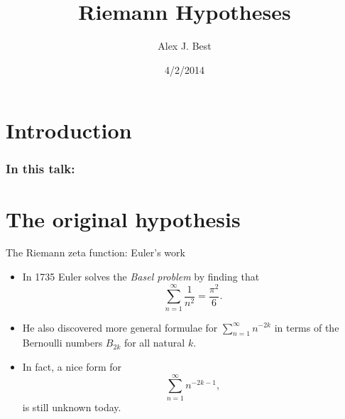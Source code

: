 \documentclass{beamer}
\author{Alex J. Best}
\institute{WMS Talks}
\date{4/2/2014}
\title{Riemann Hypotheses}
\begin{document}
\section{Introduction}

\frame{\titlepage}

\begin{frame}
\frametitle{In this talk:}
\tableofcontents
{} %
\end{frame}

\section{The original hypothesis}

\begin{frame}{The Riemann zeta function: Euler's work}
\begin{itemize}
\item In 1735 Euler solves the \emph{Basel problem} by finding that
\[\sum_{n=1}^{\infty} \frac{1}{n^2} = \frac{\pi^2}{6}.\]
\pause \item He also discovered more general formulae for $\sum_{n=1}^{\infty} n^{-2k}$ in terms of the Bernoulli numbers $B_{2k}$ for all natural $k$.
\pause \item In fact, a nice form for \[\sum_{n=1}^{\infty} n^{-2k-1},\] is still unknown today.
\end{itemize}
\end{frame}
\end{document}

